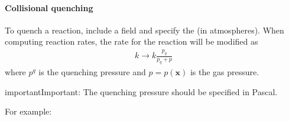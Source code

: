 \documentclass[letterpaper,10pt,english]{sphinxmanual}
\begin{document}
\paragraph{Collisional quenching}
\label{\detokenize{Applications/CdrPlasmaModel:collisional-quenching}}
To quench a reaction, include a field  and specify the  (in atmospheres).
When computing reaction rates, the rate for the reaction will be modified as
\begin{equation*}
\begin{split}k \rightarrow k\frac{p_q}{p_q + p}\end{split}
\end{equation*}
where \(p^q\) is the quenching pressure and \(p = p(\mathbf{x})\) is the gas pressure.

\begin{sphinxadmonition}{important}{Important:}
The quenching pressure should be specified in Pascal.
\end{sphinxadmonition}

For example:

\begin{sphinxVerbatim}[commandchars=\\\{\},formatcom=\scriptsize]
  \PYG{p}{[}
       
       
       
       
       
       
       
       
       
       
       
  \PYG{p}{]}
\end{sphinxVerbatim}
\end{document}
